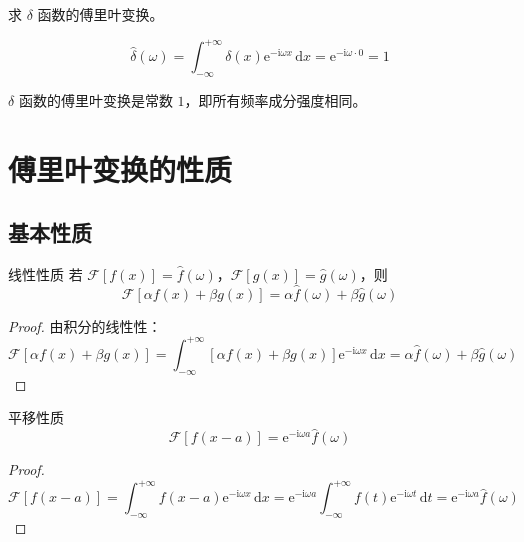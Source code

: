 \begin{lizi}{}{}
求 $\delta$ 函数的傅里叶变换。

\begin{jie}
    \begin{equation}
        \hat{\delta}(\omega) = \int_{-\infty}^{+\infty} \delta(x)\mathrm{e}^{-\mathrm{i}\omega x}\,\mathrm{d}x = \mathrm{e}^{-\mathrm{i}\omega \cdot 0} = 1
    \end{equation}
    
    $\delta$ 函数的傅里叶变换是常数 $1$，即所有频率成分强度相同。
\end{jie}
\end{lizi}

\section{傅里叶变换的性质}

\subsection{基本性质}

\begin{dingli}{}{线性性质}
若 $\mathcal{F}[f(x)] = \hat{f}(\omega)$，$\mathcal{F}[g(x)] = \hat{g}(\omega)$，则
\begin{equation}
    \mathcal{F}[\alpha f(x) + \beta g(x)] = \alpha\hat{f}(\omega) + \beta\hat{g}(\omega)
\end{equation}
\end{dingli}

\begin{proof}
由积分的线性性：
\begin{equation}
    \mathcal{F}[\alpha f(x) + \beta g(x)] = \int_{-\infty}^{+\infty} [\alpha f(x) + \beta g(x)]\mathrm{e}^{-\mathrm{i}\omega x}\,\mathrm{d}x = \alpha\hat{f}(\omega) + \beta\hat{g}(\omega)
\end{equation}
\end{proof}
\begin{dingli}{}{平移性质}
\begin{equation}
    \mathcal{F}[f(x - a)] = \mathrm{e}^{-\mathrm{i}\omega a}\hat{f}(\omega)
\end{equation}
\end{dingli}

\begin{proof}
\begin{equation}
    \mathcal{F}[f(x-a)] = \int_{-\infty}^{+\infty} f(x-a)\mathrm{e}^{-\mathrm{i}\omega x}\,\mathrm{d}x = \mathrm{e}^{-\mathrm{i}\omega a}\int_{-\infty}^{+\infty} f(t)\mathrm{e}^{-\mathrm{i}\omega t}\,\mathrm{d}t = \mathrm{e}^{-\mathrm{i}\omega a}\hat{f}(\omega)
\end{equation}
\end{proof}

